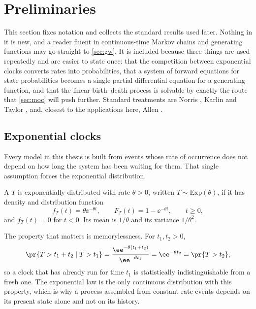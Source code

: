 \section{Preliminaries}
\label{sec:prelim}

This section fixes notation and collects the standard results used later. Nothing
in it is new, and a reader fluent in continuous-time Markov chains and generating
functions may go straight to \cref{sec:gw}. It is included because three things are
used repeatedly and are easier to state once: that the competition between
exponential clocks converts rates into probabilities, that a system of forward
equations for state probabilities becomes a single partial differential equation
for a generating function, and that the linear birth--death process is solvable by
exactly the route that \cref{sec:moc} will push further. Standard treatments are
Norris \cite{Norris1997}, Karlin and Taylor \cite{KarlinTaylor1975}, and, closest to
the applications here, Allen \cite{Allen2010}.

\subsection{Exponential clocks}
\label{sec:exp}

Every model in this thesis is built from events whose rate of occurrence does not
depend on how long the system has been waiting for them. That single assumption
forces the exponential distribution.

\begin{definition}
\label{def:exp}
A \rv{} $T$ is exponentially distributed with rate $\theta>0$, written
$T\sim\mathrm{Exp}(\theta)$, if it has density and distribution function
\begin{equation*}
f_T(t) = \theta\ee^{-\theta t},
\qquad
F_T(t) = 1-\ee^{-\theta t},
\qquad t\ge0,
\end{equation*}
and $f_T(t)=0$ for $t<0$. Its mean is $1/\theta$ and its variance $1/\theta^2$.
\end{definition}

The property that matters is memorylessness. For $t_1,t_2>0$,
\begin{equation}
\label{eq:memoryless}
\pr{T > t_1+t_2 \mid T > t_1}
= \frac{\ee^{-\theta(t_1+t_2)}}{\ee^{-\theta t_1}}
= \ee^{-\theta t_2}
= \pr{T > t_2},
\end{equation}
so a clock that has already run for time $t_1$ is statistically indistinguishable
from a fresh one. The exponential law is the only continuous distribution with this
property, which is why a process assembled from constant-rate events depends on its
present state alone and not on its history.

